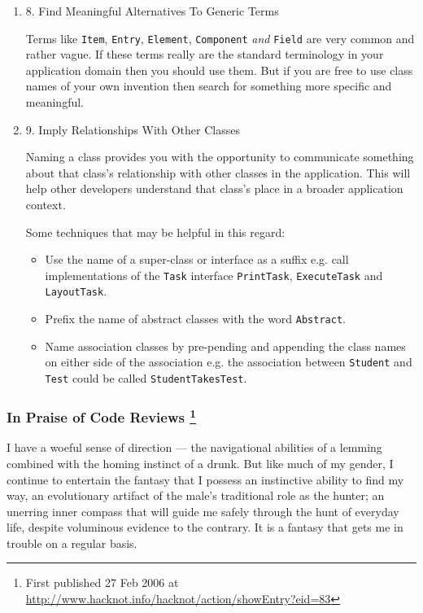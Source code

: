 \documentclass{article}
\begin{document}
\begin{enumerate}
\item 8. Find Meaningful Alternatives To Generic Terms
\label{sec:orgheadline271}

Terms like \texttt{Item}, \texttt{Entry}, \texttt{Element}, \texttt{Component} \emph{and} \texttt{Field} are
very common and rather vague. If these terms really are the standard
terminology in your application domain then you should use them. But if
you are free to use class names of your own invention then search for
something more specific and meaningful.

\item 9. Imply Relationships With Other Classes
\label{sec:orgheadline272}

Naming a class provides you with the opportunity to communicate
something about that class's relationship with other classes in the
application. This will help other developers understand that class's
place in a broader application context.

Some techniques that may be helpful in this regard:

\begin{itemize}
\item Use the name of a super-class or interface as a suffix e.g. call
implementations of the \texttt{Task} interface \texttt{PrintTask}, \texttt{ExecuteTask}
and \texttt{LayoutTask}.\\
\item Prefix the name of abstract classes with the word \texttt{Abstract}.
\item Name association classes by pre-pending and appending the class names
on either side of the association e.g. the association between
\texttt{Student} and \texttt{Test} could be called \texttt{StudentTakesTest}.
\end{itemize}
\end{enumerate}

\subsubsection{In Praise of Code Reviews \footnote{First published 27 Feb 2006 at
\url{http://www.hacknot.info/hacknot/action/showEntry?eid=83}}}
\label{sec:orgheadline277}

I have a woeful sense of direction --- the navigational abilities of a
lemming combined with the homing instinct of a drunk. But like much of
my gender, I continue to entertain the fantasy that I possess an
instinctive ability to find my way, an evolutionary artifact of the
male's traditional role as the hunter; an unerring inner compass that
will guide me safely through the hunt of everyday life, despite
voluminous evidence to the contrary. It is a fantasy that gets me in
trouble on a regular basis.
\end{document}
